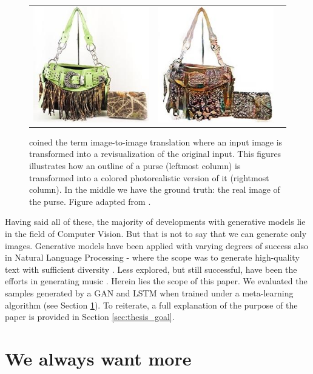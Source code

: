 \documentclass[a4paper]{book}
\begin{document}
\begin{figure}[t]
\begin{tabular}{ccc}
    \includegraphics[width=.15\linewidth]{images/handbags_edges_lotsofresults_latex/gt_130_AB.jpg} &
    \includegraphics[width=.15\linewidth]{images/handbags_edges_lotsofresults_latex/L1cGAN_130_AB.jpg} \\
    \end{tabular}
    \caption{\textcite{isola_image--image_2016} coined the term image-to-image translation where an input image is transformed into a revisualization of the original input. This figures illustrates how an outline of a purse (leftmost column) is transformed into a colored photorealistic version of it (rightmost column). In the middle we have the ground truth: the real image of the purse. Figure adapted from \textcite{isola_image--image_2016}.}
    \label{fig:pix2pix}
\end{figure}

Having said all of these, the majority of developments with generative models lie in the field of Computer Vision. But that is not to say that we can generate only images. Generative models have been applied with varying degrees of success also in Natural Language Processing - where the scope was to generate high-quality text with sufficient diversity \parencite[e.g.,][]{yu_seqgan_2016, chen_adversarial_2018}. Less explored, but still successful, have been the efforts in generating music \parencite[e.g.,][]{mogren_c-rnn-gan_2016, dong_musegan_2017}. Herein lies the scope of this paper. We evaluated the samples generated by a GAN \parencite{mogren_c-rnn-gan_2016} and LSTM \parencite{oore_this_2018} when trained under a meta-learning algorithm (see Section \ref{sec:hungry}). To reiterate, a full explanation of the purpose of the paper is provided in Section \ref{sec:thesis_goal}.

\section{We always want more}\label{sec:hungry}
\end{document}
